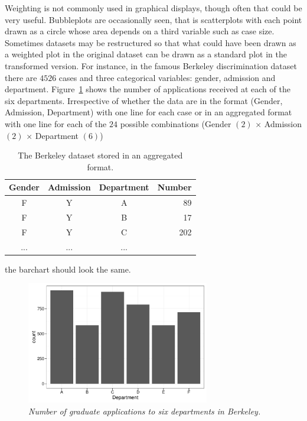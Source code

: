 \documentclass{svmult}
\begin{document}
Weighting is not commonly used in graphical displays, though often that could be very useful.  Bubbleplots are occasionally seen, that is scatterplots with each point drawn as a circle whose area depends on a third variable such as case size.  Sometimes datasets may be restructured so that what could have been drawn as a weighted plot in the original dataset can be drawn as a standard plot in the transformed version.  For instance, in the famous Berkeley discrimination dataset \citep{bickel:1975} there are $4526$ cases and three categorical variables: gender, admission and department.  Figure~\ref{berk} shows the number of applications received at each of the six departments. Irrespective of whether the data are in the format (Gender, Admission, Department) with one line for each case or in an aggregated format with one line for each of the $24$ possible combinations (Gender $(2)$ $\times$ Admission $(2)$ $\times$ Department $(6)$)
\begin{table}[h]
\begin{center}
\caption{The Berkeley dataset stored in an aggregated format.}
\begin{tabular}{|c|c|c|r|}
\hline
Gender & Admission & Department & Number\\
\hline
F & Y & A & 89\\
F & Y & B & 17\\
F & Y & C & 202\\
... &... &... &\\
\hline
\end{tabular}
\end{center}
\label{berktab}
\end{table}
the barchart should look the same.

\begin{figure}[htbp]
  \centering
  \includegraphics[width=8cm]{berkeley}
  \caption{\em Number of graduate applications to six departments in Berkeley.}
  \label{berk}
\end{figure}
\end{document}
